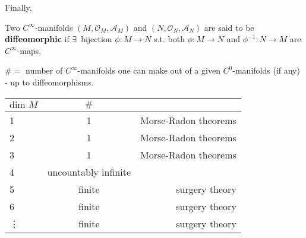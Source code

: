 Finally,
\begin{definition}
Two $C^{\infty}$-manifolds $(M,\mathcal{O}_M, \mathcal{A}_M)$ and $(N,\mathcal{O}_N, \mathcal{A}_N)$ are said to be \textbf{diffeomorphic} if $\exists \, $ bijection $\phi : M \to N$ s.t. both $\phi : M \to N$ and $\phi^{-1} : N \to M$ are $C^{\infty}$-maps.


\end{definition}

\begin{theorem}
  $\# = $ number of $C^{\infty}$-manifolds one can make out of a given $C^0$-manifolds (if any) - up to diffeomorphisms.  

\begin{tabular}{l | c | r }
$\text{dim }M$ &  $\#$ &  \\
\hline
1  & 1  & Morse-Radon theorems \\
2  & 1  & Morse-Radon theorems \\
3 & 1  & Morse-Radon theorems \\
4 & uncountably infinite & \\
5 &   finite  & surgery theory \\
6 &  finite & surgery theory \\
\vdots & finite & surgery theory \\
\hline
\end{tabular}

\end{theorem}
